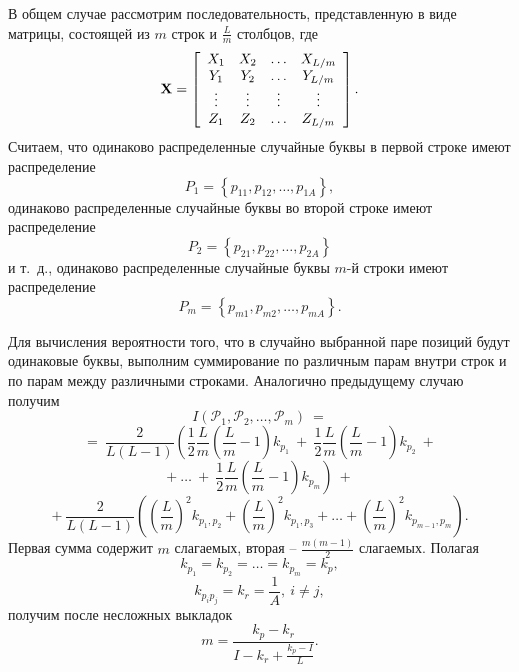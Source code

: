 В общем случае рассмотрим последовательность, представленную в виде матрицы, состоящей из $m$  строк и $\frac{L}{m}$ столбцов, где
\[
{\mathbf X} = \left[ {\begin{array}{*{20}c}
   {X_1 } & {X_2 } &  \ldots  & {X_{L/m} }  \\
   {Y_1 } & {Y_2 } &  \ldots  & {Y_{L/m} }  \\
    \vdots  &  \vdots  &  \vdots  &  \vdots   \\
   {Z_1 } & {Z_2 } &  \ldots  & {Z_{L/m} }  \\
\end{array}} \right].
\]
Считаем, что одинаково распределенные случайные буквы в первой строке имеют распределение
    \[ P_1  = \left\{ {p_{11} ,p_{12} ,  \ldots , p_{1A} } \right\}, \]
одинаково распределенные случайные буквы во второй строке имеют распределение
    \[ P_2  = \left\{ {p_{21} ,p_{22} ,  \ldots , p_{2A} } \right\} \]
и т.~д., одинаково распределенные случайные буквы $m$-й строки имеют распределение
    \[ P_m  = \left\{ {p_{m1},p_{m2} ,  \ldots , p_{mA} } \right\}. \]

Для вычисления вероятности того, что в случайно выбранной паре позиций будут одинаковые буквы, выполним суммирование по различным парам внутри строк и по парам между различными строками. Аналогично предыдущему случаю получим
{ \small
\[
    I(\mathcal{P}_1, \mathcal{P}_2, \ldots, \mathcal{P}_m ) ~=
\] \[
    =~ \frac{2}{L(L - 1)} \left( \frac{1}{2} \frac{L}{m} \left( \frac{L}{m} - 1 \right) k_{p_1} ~+~
        \frac{1}{2} \frac{L}{m} \left( \frac{L}{m} - 1 \right) k_{p_2} ~+ \right.
\] \[
        +~ \dots ~+~ \left. \frac{1}{2} \frac{L}{m} \left( \frac{L}{m} - 1 \right) k_{p_m} \right) ~+
\] \[
       +~ \frac{2}{L(L - 1)} \left( \left( \frac{L}{m} \right)^2 k_{p_1, p_2} +
         \left( \frac{L}{m} \right)^2 k_{p_1, p_3} + \dots +
        \left( \frac{L}{m} \right)^2 k_{p_{m - 1}, p_m } \right).
\] }
Первая сумма содержит  $m$ слагаемых, вторая -- $ \frac{m(m-1)}{2}$ слагаемых. Полагая
    \[ k_{p_1} = k_{p_2} = \dots = k_{p_m} = k_p, \]
    \[ k_{p_i p_j } = k_r = \frac{1}{A}, ~ i \ne j, \]
получим после несложных выкладок
    \[ m = \frac{k_p  - k_r}{I - k_r  + \frac{k_p  - I}{L}}. \]
